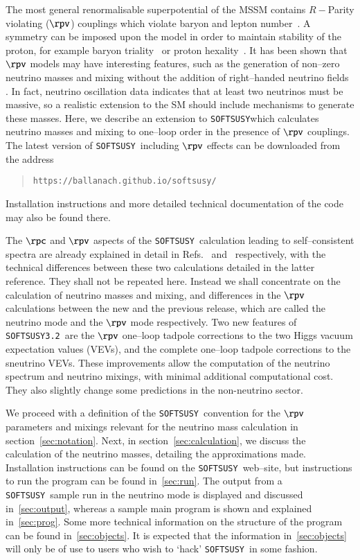 \documentclass[pdflatex,final,3p,times]{elsarticle}
\def\SOFTSUSY{{\tt SOFTSUSY}}
\begin{document}
The most general renormalisable superpotential of the MSSM contains
$R-$Parity violating ($\rpv$) couplings which violate baryon and lepton
number~\cite{Dreiner:1997uz}. A symmetry can be imposed upon the model
in order to maintain stability of the proton, for example baryon
triality~\cite{Ibanez:1991pr} or proton
hexality~\cite{Dreiner:2007vp}.  It has been shown that $\rpv$ models
may have interesting features, such as the generation of non--zero
neutrino masses and mixing without the addition of right--handed neutrino
fields 
\cite{Hall:1983id}.  In fact, neutrino oscillation data indicates that
at least two neutrinos must be massive, so a realistic extension to
the SM should include mechanisms to generate these masses.  Here, we
describe an extension to \SOFTSUSY\@ which calculates neutrino masses
and mixing to one--loop order in the presence of $\rpv$ couplings.
The latest version of \SOFTSUSY~including $\rpv$ effects can be
downloaded from the address
\begin{quote}
{\tt https://ballanach.github.io/softsusy/} 
\end{quote}
Installation instructions and more detailed technical documentation of the
code may also be found there.

The $\rpc$ and $\rpv$ aspects of the \SOFTSUSY~calculation leading to
self--consistent spectra are already explained in detail in
Refs.~\cite{Allanach:2001kg} and~\cite{Allanach:2009bv} respectively,
with the technical differences between these two calculations detailed
in the latter reference.  They shall not be repeated here.  Instead we shall
concentrate on the 
calculation of neutrino masses and mixing, and differences in the
$\rpv$ calculations between the new and the previous release, which
are called the neutrino mode and the $\rpv$ mode respectively.  
Two new features of {\tt SOFTSUSY3.2}~are the $\rpv$ one--loop tadpole
corrections to the 
two Higgs vacuum expectation values (VEVs), and the complete one--loop
tadpole corrections to the sneutrino VEVs.  
These improvements allow the computation of the neutrino spectrum and neutrino
mixings, with minimal additional computational cost. They also slightly change
some predictions in the non-neutrino sector. 

We proceed with a definition of the \SOFTSUSY~convention for the
$\rpv$ parameters and mixings relevant for the neutrino mass
calculation in section~\ref{sec:notation}. Next, in
section~\ref{sec:calculation}, we discuss the calculation of the
neutrino masses, detailing the approximations made.  Installation
instructions can be found on the \SOFTSUSY~web--site, but instructions
to run the program can be found in~\ref{sec:run}.  The output
from a \SOFTSUSY~sample run in the neutrino mode is displayed and
discussed in~\ref{sec:output}, whereas a sample main program
is shown and explained in~\ref{sec:prog}. Some more technical
information on the structure of the program can be found in~\ref{sec:objects}.
It is expected that the information in~\ref{sec:objects} will only be of use
to users who wish to 
`hack' \SOFTSUSY~in some fashion.
\end{document}
